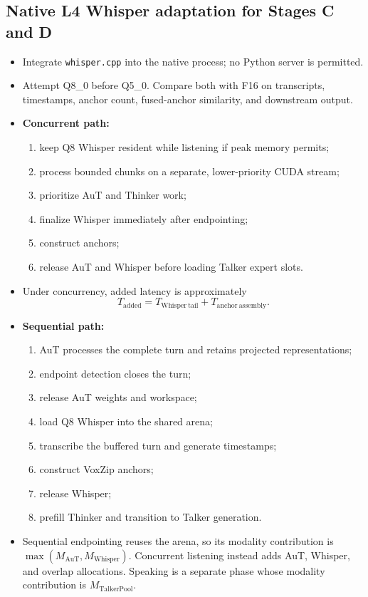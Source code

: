 \documentclass[10pt,letterpaper]{article}
\newcommand{\code}[1]{\texttt{#1}}
\begin{document}
\subsection{Native L4 Whisper adaptation for Stages C and D}
\begin{itemize}
    \item Integrate \code{whisper.cpp} into the native process; no Python server is permitted.
    \item Attempt Q8\_0 before Q5\_0. Compare both with F16 on transcripts, timestamps, anchor count, fused-anchor similarity, and downstream output.
    \item \textbf{Concurrent path:}
    \begin{enumerate}
        \item keep Q8 Whisper resident while listening if peak memory permits;
        \item process bounded chunks on a separate, lower-priority CUDA stream;
        \item prioritize AuT and Thinker work;
        \item finalize Whisper immediately after endpointing;
        \item construct anchors;
        \item release AuT and Whisper before loading Talker expert slots.
    \end{enumerate}
    \item Under concurrency, added latency is approximately
    \[
    T_{\mathrm{added}}=T_{\mathrm{Whisper\ tail}}+T_{\mathrm{anchor\ assembly}}.
    \]
    \item \textbf{Sequential path:}
    \begin{enumerate}
        \item AuT processes the complete turn and retains projected representations;
        \item endpoint detection closes the turn;
        \item release AuT weights and workspace;
        \item load Q8 Whisper into the shared arena;
        \item transcribe the buffered turn and generate timestamps;
        \item construct VoxZip anchors;
        \item release Whisper;
        \item prefill Thinker and transition to Talker generation.
    \end{enumerate}
    \item Sequential endpointing reuses the arena, so its modality contribution is $\max(M_{\mathrm{AuT}},M_{\mathrm{Whisper}})$. Concurrent listening instead adds AuT, Whisper, and overlap allocations. Speaking is a separate phase whose modality contribution is $M_{\mathrm{TalkerPool}}$.

\end{itemize}
\end{document}

